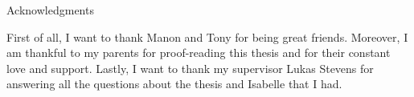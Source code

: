 \thispagestyle{empty}

\vspace*{20mm}

\begin{center}
{ Acknowledgments}
\end{center}

\vspace{10mm}

First of all, I want to thank Manon and Tony for being great friends.
Moreover, I am thankful to my parents for proof-reading this thesis and for their constant love and support.
Lastly, I want to thank my supervisor Lukas Stevens for answering all the questions about the thesis and Isabelle that I had.


\cleardoublepage{}
